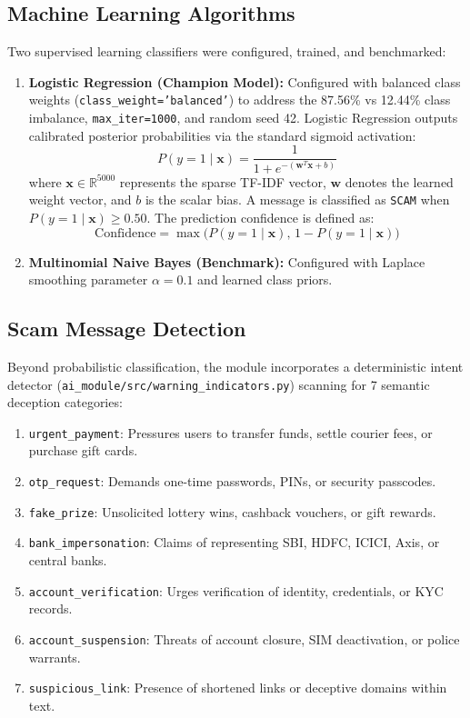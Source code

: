 \documentclass[conference]{IEEEtran}
\begin{document}
\subsection{Machine Learning Algorithms}
Two supervised learning classifiers were configured, trained, and benchmarked:
\begin{enumerate}
    \item \textbf{Logistic Regression (Champion Model):} Configured with balanced class weights (\texttt{class\_weight='balanced'}) to address the 87.56\% vs 12.44\% class imbalance, \texttt{max\_iter=1000}, and random seed 42. Logistic Regression outputs calibrated posterior probabilities via the standard sigmoid activation:
    \begin{equation}
    P(y = 1 \mid \mathbf{x}) = \frac{1}{1 + e^{-(\mathbf{w}^T \mathbf{x} + b)}}
    \label{eq:lr}
    \end{equation}
    where $\mathbf{x} \in \mathbb{R}^{5000}$ represents the sparse TF-IDF vector, $\mathbf{w}$ denotes the learned weight vector, and $b$ is the scalar bias. A message is classified as \texttt{SCAM} when $P(y = 1 \mid \mathbf{x}) \ge 0.50$. The prediction confidence is defined as:
    \begin{equation}
    \text{Confidence} = \max\bigl(P(y = 1 \mid \mathbf{x}),\, 1 - P(y = 1 \mid \mathbf{x})\bigr)
    \end{equation}
    \item \textbf{Multinomial Naive Bayes (Benchmark):} Configured with Laplace smoothing parameter $\alpha = 0.1$ and learned class priors.
\end{enumerate}

\subsection{Scam Message Detection}
Beyond probabilistic classification, the module incorporates a deterministic intent detector (\texttt{ai\_module/src/warning\_indicators.py}) scanning for 7 semantic deception categories:
\begin{enumerate}
    \item \texttt{urgent\_payment}: Pressures users to transfer funds, settle courier fees, or purchase gift cards.
    \item \texttt{otp\_request}: Demands one-time passwords, PINs, or security passcodes.
    \item \texttt{fake\_prize}: Unsolicited lottery wins, cashback vouchers, or gift rewards.
    \item \texttt{bank\_impersonation}: Claims of representing SBI, HDFC, ICICI, Axis, or central banks.
    \item \texttt{account\_verification}: Urges verification of identity, credentials, or KYC records.
    \item \texttt{account\_suspension}: Threats of account closure, SIM deactivation, or police warrants.
    \item \texttt{suspicious\_link}: Presence of shortened links or deceptive domains within text.
\end{enumerate}
\end{document}
